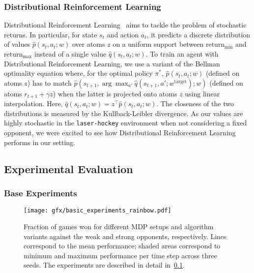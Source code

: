 \subsubsection{Distributional Reinforcement Learning}\label{subsubsec:distributional}

Distributional Reinforcement Learning~\cite{bellemare17distributional} aims to tackle the problem of stochastic returns. In particular, for state $s_t$ and action $a_t$, it predicts a discrete distribution of values $\hat{p}(s_t, a_t; w)$ over atoms $z$ on a uniform support between $\text{return}_\text{min}$ and $\text{return}_\text{max}$ instead of a single value $\hat{q}(s_t, a_t; w)$. To train an agent with Distributional Reinforcement Learning, we use a variant of the Bellman optimality equation where, for the optimal policy $\pi^*$, $\hat{p}(s_t, a_t; w)$ (defined on atoms $z$) has to match $\hat{p}(s_{t+1}, \arg\max_{a'} \hat{q}(s_{t+1}, a'; w^\text{target}); w)$ (defined on atoms $r_{t+1} + \gamma z$) when the latter is projected onto atoms $z$ using linear interpolation. Here, $\hat{q}(s_t, a_t; w) = z^\top \hat{p}(s_t, a_t; w)$. The closeness of the two distributions is measured by the Kullback-Leibler divergence. As our values are highly stochastic in the \texttt{laser-hockey} environment when not considering a fixed opponent, we were excited to see how Distributional Reinforcement Learning performs in our setting.

\subsection{Experimental Evaluation}\label{subsec:rainbow_experimental}

\subsubsection{Base Experiments}\label{subsubsec:base}

\begin{figure}
    \centering
    \texttt{[image: gfx/basic\_experiments\_rainbow.pdf]}
    \caption{Fraction of games won for different MDP setups and algorithm variants against the weak and strong opponents, respectively. Lines correspond to the mean performance; shaded areas correspond to minimum and maximum performance per time step across three seeds. The experiments are described in detail in~\ref{subsec:rainbow_experimental}.}
    \label{fig:basic_experiments_rainbow}
\end{figure}


